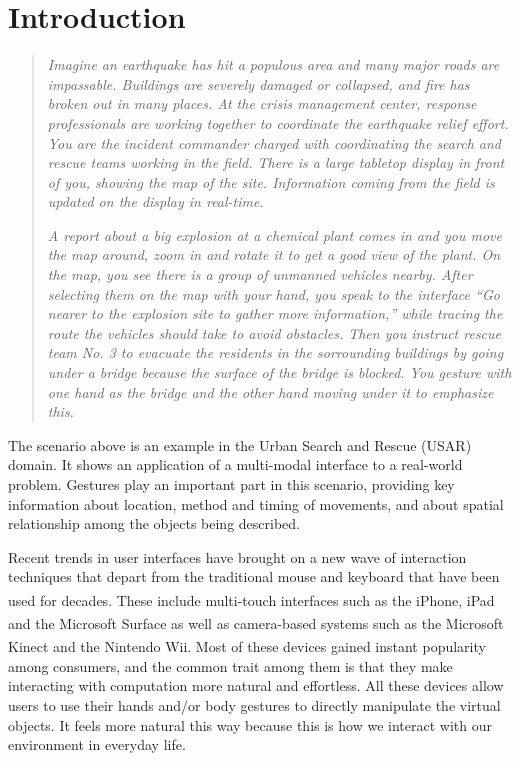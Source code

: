 \section{Introduction}
\begin{quotation}
\textit{Imagine an earthquake has hit a populous area and many major roads are
impassable. Buildings are severely damaged or collapsed, and fire has broken out
in many places. At the crisis management center, response professionals are
working together to coordinate the earthquake relief effort. You are the
incident commander charged with coordinating the search
and rescue teams working in the field. There is a large tabletop display in
front of you, showing the map of the site. Information coming from the field is
updated on the display in real-time.}

\textit{A report about a big explosion at a chemical plant comes in and you move
the map around, zoom in and rotate it to get a good view of the plant. On the
map, you see there is a group of unmanned vehicles nearby. After selecting them
on the map with your hand, you speak to the interface ``Go nearer to the
explosion site to gather more information,'' while tracing the route the
vehicles should take to avoid obstacles. Then you instruct rescue team No. 3 to evacuate the residents
in the sorrounding buildings by going under a bridge because the surface of the
bridge is blocked. You gesture with one hand as the bridge and the other
hand moving under it to emphasize this.}
\end{quotation}

The scenario above is an example in the Urban Search and Rescue (USAR) domain.
It shows an application of a multi-modal interface to a real-world problem. Gestures play an important part in this scenario,
providing key information about location, method and timing of movements,
and about spatial relationship among the objects being described.

Recent trends in user interfaces have brought on a new wave of interaction
techniques that depart from the traditional mouse and keyboard that have been 
used for decades. These include multi-touch interfaces such as the 
iPhone\textsuperscript{\textregistered}, iPad and the Microsoft 
Surface\textsuperscript{\textregistered} as well as camera-based systems such as
the Microsoft Kinect and the Nintendo\textsuperscript{\textregistered} Wii. Most
of these devices gained instant popularity among consumers, and the common trait
among them is that they make interacting with computation more natural and 
effortless. All these devices allow users to use their hands and/or body 
gestures to directly manipulate the virtual objects. It feels more natural this 
way because this is how we interact with our environment in everyday life.
 
